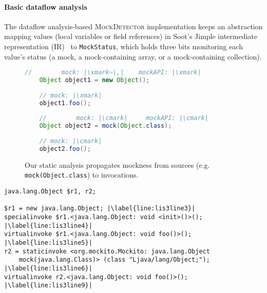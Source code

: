 \paragraph{Basic dataflow analysis} The dataflow analysis-based \textsc{MockDetector} implementation keeps an abstraction mapping values (local variables or field references) in Soot's Jimple intermediate representation (IR)~\cite{Vallee-Rai:1999:SJB:781995.782008} to \texttt{MockStatus}, which holds three bits monitoring each value's status (a mock, a mock-containing array, or a mock-containing collection). %

\begin{figure}[H]
	\begin{lstlisting}[basicstyle=\ttfamily,
	basicstyle=\scriptsize\ttfamily,language = Java, framesep=4.5mm, framexleftmargin=1.0mm, captionpos=b, escapechar=|, morekeywords={@Test}]
	//        mock: |\xmark~\,|    mockAPI: |\xmark|
	Object object1 = new Object();
	
	// mock: |\xmark|
	object1.foo();
	
	//        mock: |\cmark|     mockAPI: |\cmark|
	Object object2 = mock(Object.class);
	
	// mock: |\cmark|
	object2.foo();
	\end{lstlisting}
	\caption{Our static analysis propagates mockness from sources (e.g. \texttt{mock(Object.class}) to invocations.}
	\label{fig:mockMethodIllustration}
	
\end{figure}

\begin{lstlisting}[basicstyle=\ttfamily, caption={Jimple Intermediate Representation for the code in Figure~\ref{fig:mockMethodIllustration}.},
basicstyle=\scriptsize\ttfamily, captionpos=b, label=lis:mockMethodIllustrationIR, escapechar=|, morekeywords={@Test, specialinvoke, virtualinvoke, staticinvoke}]
java.lang.Object $r1, r2;

$r1 = new java.lang.Object; |\label{line:lis3line3}|
specialinvoke $r1.<java.lang.Object: void <init>()>(); |\label{line:lis3line4}|
virtualinvoke $r1.<java.lang.Object: void foo()>(); |\label{line:lis3line5}|
r2 = staticinvoke <org.mockito.Mockito: java.lang.Object
	mock(java.lang.Class)> (class "Ljava/lang/Object;"); |\label{line:lis3line6}|
virtualinvoke r2.<java.lang.Object: void foo()>(); |\label{line:lis3line9}|
\end{lstlisting}


